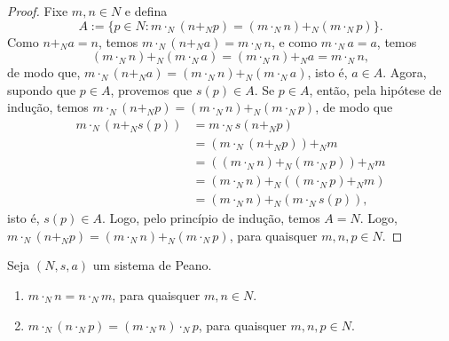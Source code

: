 \begin{proof}
    Fixe $m,n \in N$ e defina
        \[
            A := \{p \in N : m \cdot_N (n +_N p) = (m \cdot_N n) +_N (m \cdot_N p)\}.
        \]
    Como $n +_N a = n$, temos $m \cdot_N (n +_N a) = m \cdot_N n$, e como $m \cdot_N a = a$, temos
        \[
            (m \cdot_N n) +_N (m \cdot_N a) = (m \cdot_N n) +_N a = m \cdot_N n,
        \]
    de modo que, $m \cdot_N (n +_N a) = (m \cdot_N n) +_N (m \cdot_N a)$, isto é, $a \in A$. Agora, supondo que $p \in A$, provemos que $s(p) \in A$. Se $p \in A$, então, pela hipótese de indução, temos $m \cdot_N (n +_N p) = (m \cdot_N n) +_N (m \cdot_N p)$, de modo que
        \begin{align*}
            m \cdot_N (n +_N s(p)) &= m \cdot_N s(n +_N p) \\
            &= (m \cdot_N (n +_N p)) +_N m \\
            &= ((m \cdot_N n) +_N (m \cdot_N p)) +_N m \\
            &= (m \cdot_N n) +_N ((m \cdot_N p) +_N m) \\
            &= (m \cdot_N n) +_N (m \cdot_N s(p)),
        \end{align*}
    isto é, $s(p) \in A$. Logo, pelo princípio de indução, temos $A = N$. Logo, $m \cdot_N (n +_N p) = (m \cdot_N n) +_N (m \cdot_N p)$, para quaisquer $m,n,p \in N$. \blackproof
\end{proof}

\begin{theorem}
    Seja $(N,s,a)$ um sistema de Peano.
        \begin{enumerate}[leftmargin=*, align=left, label=\textbf{(\alph*)}]
            \item $m \cdot_N n = n \cdot_N m$, para quaisquer $m,n \in N$.
            \item $m \cdot_N (n \cdot_N p)= (m \cdot_N n) \cdot_N p$, para quaisquer $m,n,p \in N$.
        \end{enumerate}
\end{theorem}

